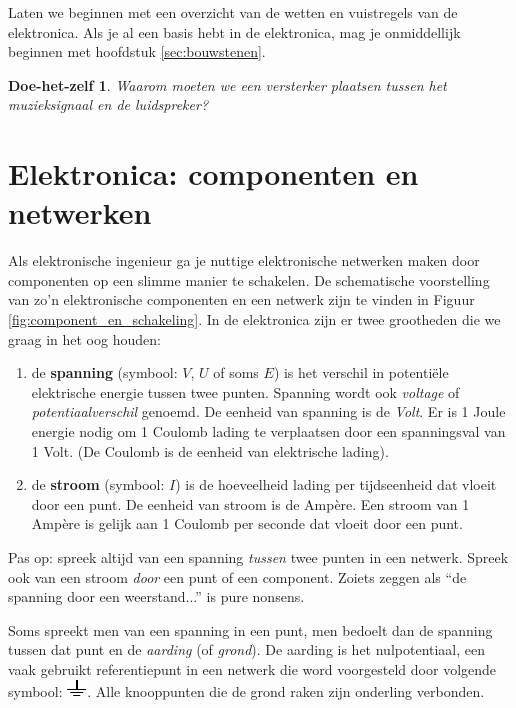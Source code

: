 \documentclass{article}
\newtheorem{DIY}{Doe-het-zelf}
\begin{document}
		Laten we beginnen met een overzicht van de wetten en vuistregels van de elektronica. Als je al een basis hebt in de elektronica, mag je onmiddellijk beginnen met hoofdstuk \ref{sec:bouwstenen}.
		\begin{DIY}
			Waarom moeten we een versterker plaatsen tussen het muzieksignaal en de luidspreker?
		\end{DIY}
	\section{Elektronica: componenten en netwerken}

		Als elektronische ingenieur ga je nuttige elektronische netwerken maken door componenten op een slimme manier te schakelen. De schematische voorstelling van zo'n elektronische componenten en een netwerk zijn te vinden in Figuur \ref{fig:component_en_schakeling}. In de elektronica zijn er twee grootheden die we graag in het oog houden:

		\begin{enumerate}
			\item de \textbf{spanning} (symbool: $V$, $U$ of soms $E$) is het verschil in potenti\"ele elektrische energie tussen twee punten. Spanning wordt ook \emph{voltage} of \emph{potentiaalverschil} genoemd. De eenheid van spanning is de \emph{Volt}. Er is 1 Joule energie nodig om 1 Coulomb lading te verplaatsen door een spanningsval van 1 Volt. (De Coulomb is de eenheid van elektrische lading).

			\item de \textbf{stroom} (symbool: $I$) is de hoeveelheid lading per tijdseenheid dat vloeit door een punt. De eenheid van stroom is de Amp\`ere. Een stroom van 1 Amp\`ere is gelijk aan 1 Coulomb per seconde dat vloeit door een punt.
		\end{enumerate}

		Pas op: spreek altijd van een spanning \emph{tussen} twee punten in een netwerk. Spreek ook van een stroom \emph{door} een punt of een component. Zoiets zeggen als ``de spanning door een weerstand...'' is pure nonsens. 

		Soms spreekt men van een spanning in een punt, men bedoelt dan de spanning tussen dat punt en de \emph{aarding} (of \emph{grond}). De aarding is het nulpotentiaal, een vaak gebruikt referentiepunt in een netwerk die word voorgesteld door volgende symbool: \includegraphics[height=2ex]{gnd}. Alle knooppunten die de grond raken zijn onderling verbonden.
\end{document}
